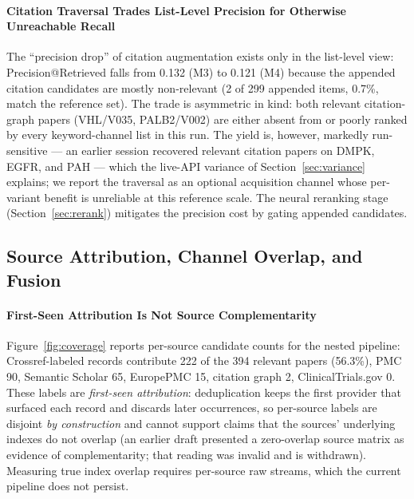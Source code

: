 \documentclass[sigconf,screen]{acmart}
\begin{document}
\paragraph{Citation Traversal Trades List-Level Precision for Otherwise Unreachable Recall}
The ``precision drop'' of citation augmentation exists only in the
list-level view: Precision@Retrieved falls from 0.132 (M3) to 0.121 (M4)
because the appended citation candidates are mostly non-relevant (2 of 299
appended items, 0.7\%, match the reference set). The trade is asymmetric
in kind: both relevant citation-graph papers (VHL/V035, PALB2/V002) are
either absent from or poorly ranked by every keyword-channel list in this
run. The yield is, however, markedly run-sensitive --- an earlier session
recovered relevant citation papers on DMPK, EGFR, and PAH --- which the
live-API variance of Section~\ref{sec:variance} explains; we report the
traversal as an optional acquisition channel whose per-variant benefit is
unreliable at this reference scale. The neural reranking stage
(Section~\ref{sec:rerank}) mitigates the precision cost by gating appended
candidates.

\subsection{Source Attribution, Channel Overlap, and Fusion}
\label{sec:coverage}

\paragraph{First-Seen Attribution Is Not Source Complementarity}
Figure~\ref{fig:coverage} reports per-source candidate counts for the
nested pipeline: Crossref-labeled records contribute 222 of the 394
relevant papers (56.3\%), PMC 90, Semantic Scholar 65, EuropePMC 15,
citation graph 2, ClinicalTrials.gov 0. These
labels are \emph{first-seen attribution}: deduplication keeps the first
provider that surfaced each record and discards later occurrences, so
per-source labels are disjoint \emph{by construction} and cannot support
claims that the sources' underlying indexes do not overlap (an earlier
draft presented a zero-overlap source matrix as evidence of
complementarity; that reading was invalid and is withdrawn). Measuring
true index overlap requires per-source raw streams, which the current
pipeline does not persist.
\end{document}
